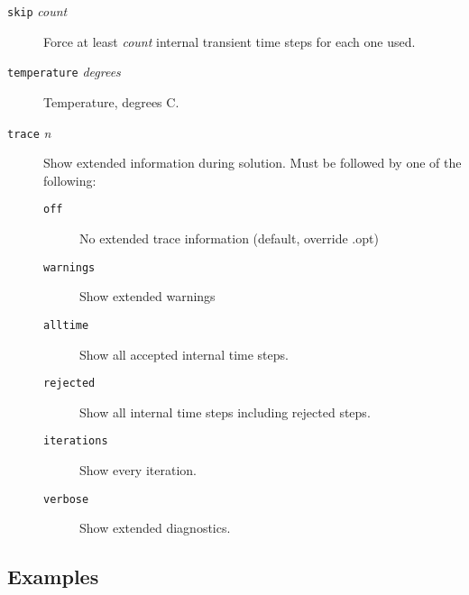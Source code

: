 \begin{description}
\item[{\tt skip} {\it count}]
Force at least {\it count} internal transient time steps for each one
used.

\item[{\tt temperature} {\it degrees}]
Temperature, degrees C.

\item[{\tt trace} {\it n}]
Show extended information during solution.
Must be followed by one of the following:
\begin{description}
\item[{\tt off}] No extended trace information (default, override .opt)
\item[{\tt warnings}] Show extended warnings
\item[{\tt alltime}] Show all accepted internal time steps.
\item[{\tt rejected}] Show all internal time steps including rejected steps.
\item[{\tt iterations}] Show every iteration.
\item[{\tt verbose}] Show extended diagnostics.
\end{description}

\end{description}
\subsection{Examples}


